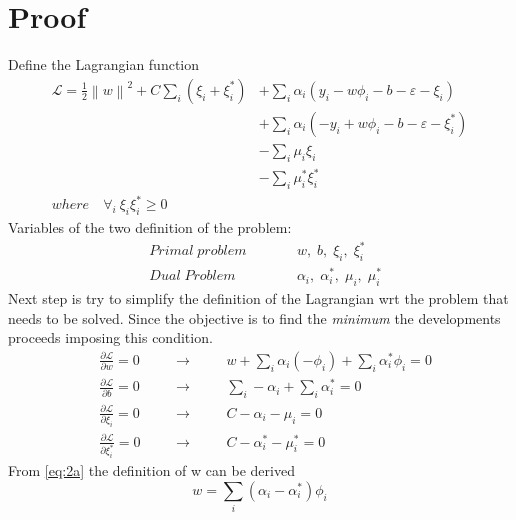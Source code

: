 \documentclass{article}
\newcommand{\norm}[1]{\left\lVert#1\right\rVert}
\newcommand{\Lagr}{\mathcal{L}}
\begin{document}
\section{Proof}
Define the Lagrangian function
\begin{equation}\label{eq:1}
    \begin{aligned}
        \Lagr = \frac{1}{2} \norm{w}^2 + C \sum_i (\xi_i + \xi_i^*) &+\sum_i \alpha_i (y_i - w\phi_i -b - \varepsilon - \xi_i) \\
        &+\sum_i \alpha_i (-y_i + w\phi_i -b - \varepsilon - \xi_i^*) \\
        &-\sum_i \mu_i\xi_i \\
        &-\sum_i \mu_i^*\xi_i^* \\
        where \quad \forall_i \: \xi_i\xi_i^* \geq 0
    \end{aligned}
\end{equation}
Variables of the two definition of the problem:
\begin{equation*}
    \begin{aligned}
            &Primal \; problem \qquad && w, \; b, \; \xi_i, \; \xi_i^* \\
            &Dual \; Problem && \alpha_i, \; \alpha_i^*, \; \mu_i, \; \mu_i^*
    \end{aligned}
\end{equation*}
Next step is try to simplify the definition of the Lagrangian wrt the problem that needs to be solved. Since the objective is to find the \textit{minimum} the developments proceeds imposing this condition.
\begin{subequations}
    \begin{align}
        &\frac {\partial \Lagr}{\partial w} = 0 \quad &&\longrightarrow \quad && w + \sum_i \alpha_i(-\phi_i) + \sum_i \alpha_i^*\phi_i = 0 \label{eq:2a}\\
        &\frac {\partial \Lagr}{\partial b} = 0 &&\longrightarrow && \sum_i -\alpha_i + \sum_i \alpha_i^* = 0 \label{eq:2b}\\
        &\frac {\partial \Lagr}{\partial \xi_i} = 0 &&\longrightarrow && C - \alpha_i - \mu_i = 0 \label{eq:2c}\\
        &\frac {\partial \Lagr}{\partial \xi_i^*} = 0 &&\longrightarrow && C - \alpha_i^* - \mu_i^* = 0 \label{eq:2d}
    \end{align}
\end{subequations}
From \eqref{eq:2a} the definition of w can be derived
\begin{equation}\label{eq:3}
    w = \sum_i (\alpha_i - \alpha_i^*)\phi_i
\end{equation}
\end{document}
